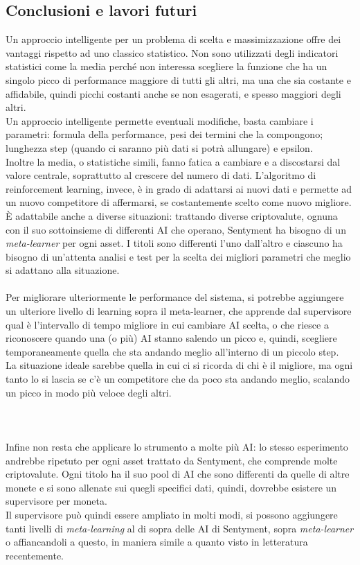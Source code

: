 \documentclass[a4paper,12pt]{report}
\begin{document}
\begin{fig}
\chapter{Conclusioni e lavori futuri}
\label{cap5}
Un approccio intelligente per un problema di scelta e massimizzazione offre dei vantaggi rispetto ad uno classico statistico. Non sono utilizzati degli indicatori statistici come la media perché non interessa scegliere la funzione che ha un singolo picco di performance maggiore di tutti gli altri, ma una che sia costante e affidabile, quindi picchi costanti anche se non esagerati, e spesso maggiori degli altri.\\ Un approccio intelligente permette eventuali modifiche, basta cambiare i parametri: formula della performance, pesi dei termini che la compongono; lunghezza step (quando ci saranno più dati si potrà allungare) e epsilon.\\ Inoltre la media, o statistiche simili, fanno fatica a cambiare e a discostarsi dal valore centrale, soprattutto al crescere del numero di dati. L'algoritmo di reinforcement learning, invece, è in grado di adattarsi ai nuovi dati e permette ad un nuovo competitore di affermarsi, se costantemente scelto come nuovo migliore. È adattabile anche a diverse situazioni: trattando diverse criptovalute, ognuna con il suo sottoinsieme di differenti AI che operano, Sentyment ha bisogno di un \textit{meta-learner} per ogni asset. I titoli sono differenti l'uno dall'altro e ciascuno ha bisogno di un'attenta analisi e test per la scelta dei migliori parametri che meglio si adattano alla situazione.
\\~\\Per migliorare ulteriormente le performance del sistema, si potrebbe aggiungere un ulteriore livello di learning sopra il meta-learner, che apprende dal supervisore qual è l'intervallo di tempo migliore in cui cambiare AI scelta, o che riesce a riconoscere quando una (o più) AI stanno salendo un picco e, quindi, scegliere temporaneamente quella che sta andando meglio all'interno di un piccolo step.\\ La situazione ideale sarebbe quella in cui ci si ricorda di chi è il migliore, ma ogni tanto lo si lascia se c'è un competitore che da poco sta andando meglio, scalando un picco in modo più veloce degli altri.
\\~\\\\~\\ Infine non resta che applicare lo strumento a molte più AI: lo stesso esperimento andrebbe ripetuto per ogni asset trattato da Sentyment, che comprende molte criptovalute. Ogni titolo ha il suo pool di AI che sono differenti da quelle di altre monete e si sono allenate sui quegli specifici dati, quindi, dovrebbe esistere un supervisore per moneta.\\ Il supervisore può quindi essere ampliato in molti modi, si possono aggiungere tanti livelli di \textit{meta-learning} al di sopra delle AI di Sentyment, sopra \textit{meta-learner} o affiancandoli a questo, in maniera simile a quanto visto in letteratura recentemente.


\end{fig}
\end{document}
